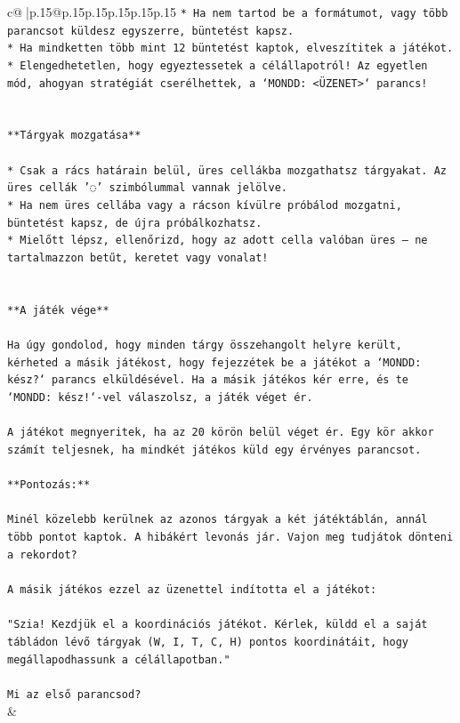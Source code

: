 \documentclass{article}
\begin{document}
{\begin{supertabular}{c@{$\;$}|p{.15\linewidth}@{}p{.15\linewidth}p{.15\linewidth}p{.15\linewidth}p{.15\linewidth}p{.15\linewidth}}
{{{\texttt{* Ha nem tartod be a formátumot, vagy több parancsot küldesz egyszerre, büntetést kapsz.} \\
\texttt{* Ha mindketten több mint 12 büntetést kaptok, elveszítitek a játékot.} \\
\texttt{* Elengedhetetlen, hogy egyeztessetek a célállapotról! Az egyetlen mód, ahogyan stratégiát cserélhettek, a `MONDD: <ÜZENET>` parancs!} \\
\\ 
\\ 
\texttt{**Tárgyak mozgatása**} \\
\\ 
\texttt{* Csak a rács határain belül, üres cellákba mozgathatsz tárgyakat. Az üres cellák '◌' szimbólummal vannak jelölve.} \\
\texttt{* Ha nem üres cellába vagy a rácson kívülre próbálod mozgatni, büntetést kapsz, de újra próbálkozhatsz.} \\
\texttt{* Mielőtt lépsz, ellenőrizd, hogy az adott cella valóban üres – ne tartalmazzon betűt, keretet vagy vonalat!} \\
\\ 
\\ 
\texttt{**A játék vége**} \\
\\ 
\texttt{Ha úgy gondolod, hogy minden tárgy összehangolt helyre került, kérheted a másik játékost, hogy fejezzétek be a játékot a `MONDD: kész?` parancs elküldésével. Ha a másik játékos kér erre, és te `MONDD: kész!`{-}vel válaszolsz, a játék véget ér.} \\
\\ 
\texttt{A játékot megnyeritek, ha az 20 körön belül véget ér. Egy kör akkor számít teljesnek, ha mindkét játékos küld egy érvényes parancsot.} \\
\\ 
\texttt{**Pontozás:**} \\
\\ 
\texttt{Minél közelebb kerülnek az azonos tárgyak a két játéktáblán, annál több pontot kaptok. A hibákért levonás jár. Vajon meg tudjátok dönteni a rekordot?} \\
\\ 
\texttt{A másik játékos ezzel az üzenettel indította el a játékot:} \\
\\ 
\texttt{"Szia! Kezdjük el a koordinációs játékot. Kérlek, küldd el a saját tábládon lévő tárgyak (W, I, T, C, H) pontos koordinátáit, hogy megállapodhassunk a célállapotban."} \\
\\ 
\texttt{Mi az első parancsod?} \\
            }
        }
    }
    & \\ \\


\end{supertabular}}
\end{document}
